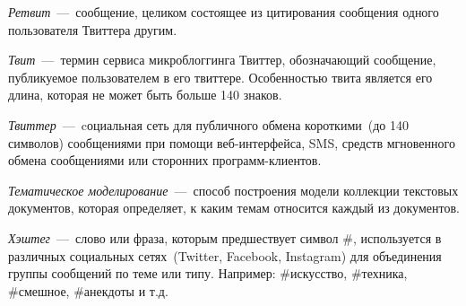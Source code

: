     \textit{Ретвит}~---~сообщение, целиком состоящее из цитирования сообщения одного пользователя Твиттера другим.

    \textit{Твит}~---~термин сервиса микроблоггинга Твиттер, обозначающий сообщение, публикуемое пользователем в его твиттере. Особенностью твита является его длина, которая не может быть больше 140 знаков.

    \textit{Твиттер}~---~cоциальная сеть для публичного обмена короткими~(до 140 символов) сообщениями при помощи веб-интерфейса, SMS, средств мгновенного обмена сообщениями или сторонних программ-клиентов.

    \textit{Тематическое моделирование}~---~способ построения модели коллекции текстовых документов, которая определяет, к каким темам относится каждый из документов.

    \textit{Хэштег}~---~слово или фраза, которым предшествует символ \#, используется в различных социальных сетях~(Twitter, Facebook, Instagram) для объединения группы сообщений по теме или типу. Например: \#искусство, \#техника, \#смешное, \#анекдоты и т.д.




